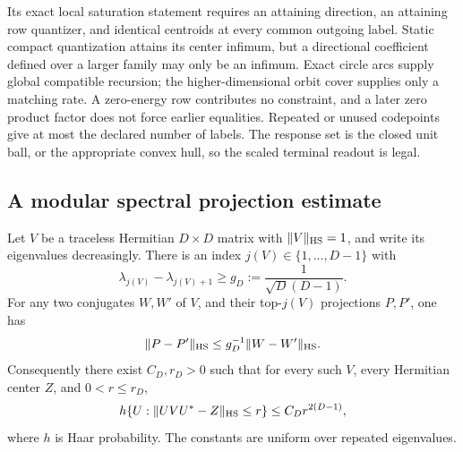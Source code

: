 Its exact local saturation statement requires an attaining direction, an attaining row quantizer, and identical centroids at every common outgoing label. Static compact quantization attains its center infimum, but a directional coefficient defined over a larger family may only be an infimum. Exact circle arcs supply global compatible recursion; the higher-dimensional orbit cover supplies only a matching rate. A zero-energy row contributes no constraint, and a later zero product factor does not force earlier equalities. Repeated or unused codepoints give at most the declared number of labels. The response set is the closed unit ball, or the appropriate convex hull, so the scaled terminal readout is legal.

\subsection{A modular spectral projection estimate}
\begin{lemma}\label{lem:orbit-gap}
Let $V$ be a traceless Hermitian $D\times D$ matrix with $\|V\|_{\rm HS}=1$, and write its eigenvalues decreasingly. There is an index $j(V)\in\{1,\ldots,D-1\}$ with
\[
 \lambda_{j(V)}-\lambda_{j(V)+1}\ge g_D:=\frac1{\sqrt D(D-1)}.
\]
For any two conjugates $W,W'$ of $V$, and their top-$j(V)$ projections $P,P'$, one has
\begin{equation}\label{eq:projector-bound}
 \|P-P'\|_{\rm HS}\le g_D^{-1}\|W-W'\|_{\rm HS}.
\end{equation}
Consequently there exist $C_D,r_D>0$ such that for every such $V$, every Hermitian center $Z$, and $0<r\le r_D$,
\[
 h\{U:\|UVU^*-Z\|_{\rm HS}\le r\}\le C_D r^{2(D-1)},
\]
where $h$ is Haar probability. The constants are uniform over repeated eigenvalues.
\end{lemma}
